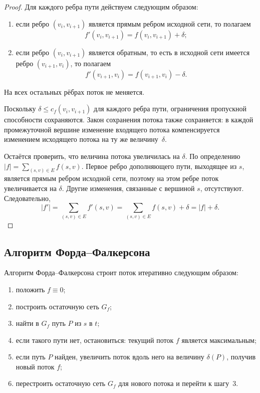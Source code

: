 \begin{proof}
	Для каждого ребра пути действуем следующим образом:
	\begin{enumerate}[label=\arabic*)]
		\item если ребро $(v_i,v_{i+1})$ является прямым ребром исходной сети, то полагаем
		\[
		f'(v_i,v_{i+1})=f(v_i,v_{i+1})+\delta;
		\]
		\item если ребро $(v_i,v_{i+1})$ является обратным, то есть в исходной сети имеется ребро $(v_{i+1},v_i)$, то полагаем
		\[
		f'(v_{i+1},v_i)=f(v_{i+1},v_i)-\delta.
		\]
	\end{enumerate}
	На всех остальных рёбрах поток не меняется.
	
	Поскольку $\delta \le c_f(v_i,v_{i+1})$ для каждого ребра пути, ограничения пропускной способности сохраняются. Закон сохранения потока также сохраняется: в каждой промежуточной вершине изменение входящего потока компенсируется изменением исходящего потока на ту же величину~$\delta$.
	
	Остаётся проверить, что величина потока увеличилась на $\delta$. По определению $|f|=\sum_{(s,v)\in E} f(s,v)$. Первое ребро дополняющего пути, выходящее из $s$, является прямым ребром исходной сети, поэтому на этом ребре поток увеличивается на $\delta$. Другие изменения, связанные с вершиной $s$, отсутствуют. Следовательно,
	\[
	|f'|=\sum_{(s,v)\in E} f'(s,v)=\sum_{(s,v)\in E} f(s,v)+\delta=|f|+\delta.
	\]
\end{proof}

\subsection{Алгоритм Форда--Фалкерсона}

\begin{Statement}{}{}
	Алгоритм Форда--Фалкерсона строит поток итеративно следующим образом:
	\begin{enumerate}[label=\arabic*)]
		\item положить $f\equiv 0$;
		\item построить остаточную сеть $G_f$;
		\item найти в $G_f$ путь $P$ из $s$ в $t$;
		\item если такого пути нет, остановиться: текущий поток $f$ является максимальным;
		\item если путь $P$ найден, увеличить поток вдоль него на величину $\delta(P)$, получив новый поток $f$;
		\item перестроить остаточную сеть $G_f$ для нового потока и перейти к шагу~3.
	\end{enumerate}
\end{Statement}

